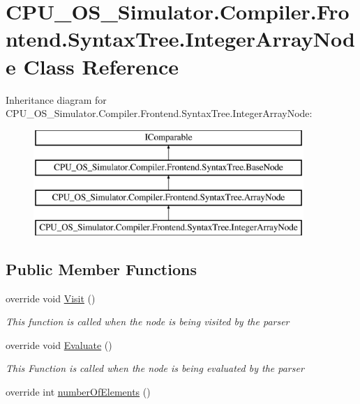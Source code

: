 \hypertarget{class_c_p_u___o_s___simulator_1_1_compiler_1_1_frontend_1_1_syntax_tree_1_1_integer_array_node}{}\section{C\+P\+U\+\_\+\+O\+S\+\_\+\+Simulator.\+Compiler.\+Frontend.\+Syntax\+Tree.\+Integer\+Array\+Node Class Reference}
\label{class_c_p_u___o_s___simulator_1_1_compiler_1_1_frontend_1_1_syntax_tree_1_1_integer_array_node}
Inheritance diagram for C\+P\+U\+\_\+\+O\+S\+\_\+\+Simulator.\+Compiler.\+Frontend.\+Syntax\+Tree.\+Integer\+Array\+Node\+:\begin{figure}[H]
\begin{center}
\leavevmode
\includegraphics[height=4.000000cm]{class_c_p_u___o_s___simulator_1_1_compiler_1_1_frontend_1_1_syntax_tree_1_1_integer_array_node}
\end{center}
\end{figure}
\subsection*{Public Member Functions}
\begin{DoxyCompactItemize}
\item 
override void \hyperlink{class_c_p_u___o_s___simulator_1_1_compiler_1_1_frontend_1_1_syntax_tree_1_1_integer_array_node_a7abbf1320b21da1362fc8d391907d33f}{Visit} ()
\begin{DoxyCompactList}\small\item\em This function is called when the node is being visited by the parser \end{DoxyCompactList}\item 
override void \hyperlink{class_c_p_u___o_s___simulator_1_1_compiler_1_1_frontend_1_1_syntax_tree_1_1_integer_array_node_a28619c1f8b99cea0b827ba5a71a00e35}{Evaluate} ()
\begin{DoxyCompactList}\small\item\em This Function is called when the node is being evaluated by the parser \end{DoxyCompactList}\item 
override int \hyperlink{class_c_p_u___o_s___simulator_1_1_compiler_1_1_frontend_1_1_syntax_tree_1_1_integer_array_node_a6172b87f60f5fd82e055b6d13969297b}{number\+Of\+Elements} ()
\end{DoxyCompactItemize}
